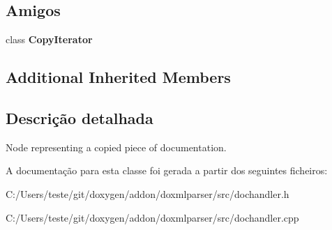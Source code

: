 \subsection*{Amigos}
\begin{DoxyCompactItemize}
\item 
\hypertarget{class_copy_handler_a6d99f95edf83a9c83db0307bc0e58e48}{class {\bfseries Copy\-Iterator}}\label{class_copy_handler_a6d99f95edf83a9c83db0307bc0e58e48}

\end{DoxyCompactItemize}
\subsection*{Additional Inherited Members}


\subsection{Descrição detalhada}
Node representing a copied piece of documentation. 



A documentação para esta classe foi gerada a partir dos seguintes ficheiros\-:\begin{DoxyCompactItemize}
\item 
C\-:/\-Users/teste/git/doxygen/addon/doxmlparser/src/dochandler.\-h\item 
C\-:/\-Users/teste/git/doxygen/addon/doxmlparser/src/dochandler.\-cpp\end{DoxyCompactItemize}
